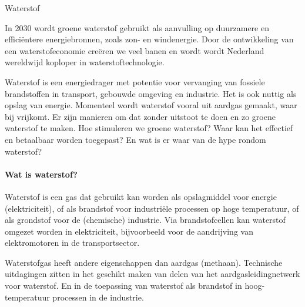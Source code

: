 \begin{voorstel}{Waterstof}


\begin{samenvatting}
In 2030 wordt groene waterstof gebruikt als aanvulling op duurzamere en efficiëntere energiebronnen, zoals zon- en windenergie. Door de ontwikkeling van een waterstofeconomie creëren we veel banen en wordt wordt Nederland wereldwijd koploper in waterstoftechnologie.
\end{samenvatting}

\begin{multicols*}{2}

\begin{uitdaging}
Waterstof is een energiedrager met potentie voor vervanging van fossiele brandstoffen in transport, gebouwde omgeving en industrie. Het is ook nuttig als opslag van energie. Momenteel wordt waterstof vooral uit aardgas gemaakt, waar \COO bij vrijkomt. Er zijn manieren om dat zonder uitstoot te doen en zo groene waterstof te maken. Hoe stimuleren we groene waterstof? Waar kan het effectief en betaalbaar worden toegepast? En wat is er waar van de hype rondom waterstof?
\end{uitdaging}

\begin{overwegingen}


\paragraph{Wat is waterstof?}
Waterstof is een gas dat gebruikt kan worden als opslagmiddel voor energie (elektriciteit), of als brandstof voor industriële processen op hoge temperatuur, of als grondstof voor de (chemische) industrie. Via brandstofcellen kan waterstof omgezet worden in elektriciteit, bijvoorbeeld voor de aandrijving van elektromotoren in de transportsector.

Waterstofgas heeft andere eigenschappen dan aardgas (methaan). Technische uitdagingen zitten in het geschikt maken van delen van het aardgasleidingnetwerk voor waterstof. En in de toepassing van waterstof als brandstof in hoog-temperatuur processen in de industrie.


\end{overwegingen}
\end{multicols*}
\end{voorstel}
